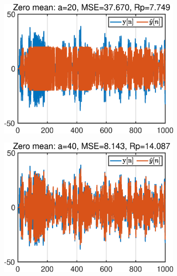 \begin{figure}[htb]
     \centering
     \hspace{-0.4cm}
     \begin{subfigure}[b]{0.33\textwidth}
         \centering
         \includegraphics[width=\textwidth]{fig/4/43a1.eps}
     \end{subfigure}
    \hspace{-0.2cm}
     \begin{subfigure}[b]{0.33\textwidth}
         \centering
         \includegraphics[width=\textwidth]{fig/4/43a2.eps}
     \end{subfigure}
    \hspace{-0.2cm}
     \begin{subfigure}[b]{0.33\textwidth}

\end{subfigure}
\end{figure}
